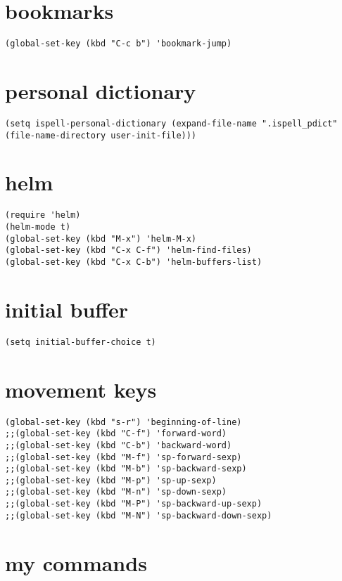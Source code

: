 \documentclass[11pt]{article}
\begin{document}
\section{bookmarks}
\label{sec:orge05e02e}
\begin{verbatim}
(global-set-key (kbd "C-c b") 'bookmark-jump)
\end{verbatim}
\section{personal dictionary}
\label{sec:org6e5c76b}
\begin{verbatim}
(setq ispell-personal-dictionary (expand-file-name ".ispell_pdict" (file-name-directory user-init-file)))
\end{verbatim}
\section{helm}
\label{sec:orge789ef1}
\begin{verbatim}
(require 'helm)
(helm-mode t)
(global-set-key (kbd "M-x") 'helm-M-x)
(global-set-key (kbd "C-x C-f") 'helm-find-files)
(global-set-key (kbd "C-x C-b") 'helm-buffers-list)
\end{verbatim}

\section{initial buffer}
\label{sec:org5f31ff2}
\begin{verbatim}
(setq initial-buffer-choice t)
\end{verbatim}
\section{movement keys}
\label{sec:orgf89ee30}
\begin{verbatim}
(global-set-key (kbd "s-r") 'beginning-of-line)
;;(global-set-key (kbd "C-f") 'forward-word)
;;(global-set-key (kbd "C-b") 'backward-word)
;;(global-set-key (kbd "M-f") 'sp-forward-sexp)
;;(global-set-key (kbd "M-b") 'sp-backward-sexp)
;;(global-set-key (kbd "M-p") 'sp-up-sexp)
;;(global-set-key (kbd "M-n") 'sp-down-sexp)
;;(global-set-key (kbd "M-P") 'sp-backward-up-sexp)
;;(global-set-key (kbd "M-N") 'sp-backward-down-sexp)
\end{verbatim}

\section{my commands}
\label{sec:org76f6ff7}
\end{document}
